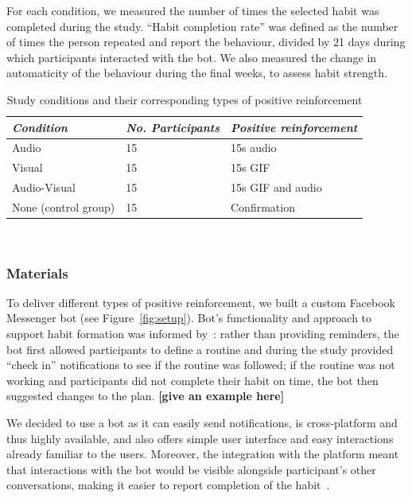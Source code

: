\documentclass{scaffold/sigchi}
\begin{document}
For each condition, we measured the number of times the selected habit was completed during the study. ``Habit completion rate'' was defined as the number of times the person repeated and report the behaviour, divided by 21 days during which participants interacted with the bot. We also measured the change in automaticity of the behaviour during the final weeks, to assess habit strength.

\begin{table}[b]
  \centering
  \begin{tabular}{l l l}
    {\small\textit{Condition}} & {\small \textit{No. Participants}} & {\small \textit{Positive reinforcement}} \\
    \midrule
    Audio & 15 & 15s audio\\
    Visual & 15 & 15s GIF \\
    Audio-Visual & 15 & 15s GIF and audio \\
    None (control group) & 15 & Confirmation \\
  \end{tabular}
  \caption{Study conditions and their corresponding types of positive reinforcement}~\label{fig:precise_rewards}
\end{table}

\subsubsection{Materials}
To deliver different types of positive reinforcement, we built a custom Facebook Messenger bot (see Figure~\ref{fig:setup}). Bot's functionality and approach to support habit formation was informed by~\cite{article_beyond_self_tracking_designing_apps}: rather than providing reminders, the bot first allowed participants to define a routine and during the study provided ``check in'' notifications to see if the routine was followed; if the routine was not working and participants did not complete their habit on time, the bot then suggested changes to the plan.
%
\textbf{[give an example here]}

We decided to use a bot as it can easily send notifications, is cross-platform and thus highly available, and also offers simple user interface and easy interactions already familiar to the users. Moreover, the integration with the platform meant that interactions with the bot would be visible alongside participant's other conversations, making it easier to report completion of the habit~\cite{the_power_of_logging_mobile_notifications}.
\end{document}
